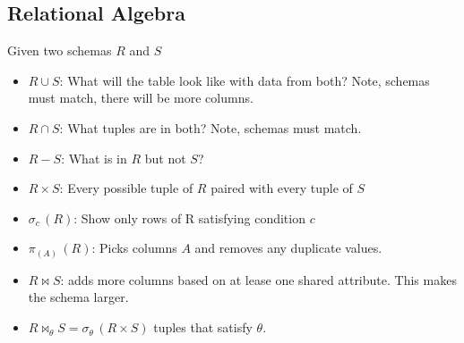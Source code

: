 \subsection{Relational Algebra}

Given two schemas $R$ and $S$
\begin{itemize}
    \item $R \cup S$: What will the table look like with data from both? Note, schemas must match, there will be more columns.
    \item $R \cap S$: What tuples are in both? Note, schemas must match. 
    \item $R - S$: What is in $R$ but not $S$?
    \item $R \times S$: Every possible tuple of $R$ paired with every tuple of $S$
    \item $\sigma_{c}\,(R)$: Show only rows of R satisfying condition $c$
    \item $\pi_{(A)}\,(R)$: Picks columns $A$ and removes any duplicate values.
    \item $R \bowtie S$: adds more columns based on at lease one shared attribute. This makes the schema larger.
    \item $R \bowtie_{\theta}S= \sigma_\theta\,(R\times S)$ tuples that satisfy $\theta$.
\end{itemize}